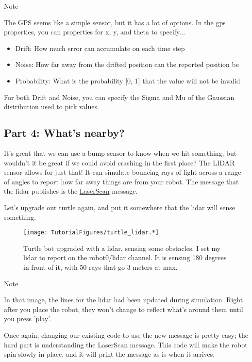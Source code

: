 Note

The GPS seems like a simple sensor, but it has a lot of options. In the
gps properties, you can properties for x, y, and theta to specify...

\begin{itemize}
\tightlist
\item
  Drift: How much error can accumulate on each time step
\item
  Noise: How far away from the drifted position can the reported
  position be
\item
  Probability: What is the probability {[}0, 1{]} that the value will
  not be invalid
\end{itemize}

For both Drift and Noise, you can specify the Sigma and Mu of the
Gaussian distribution used to pick values.

\hypertarget{part-4-whats-nearby}{%
\subsection{Part 4: What's nearby?}\label{part-4-whats-nearby}}

It's great that we can use a bump sensor to know when we hit something,
but wouldn't it be great if we could avoid crashing in the first place?
The LIDAR sensor allows for just that! It can simulate bouncing rays of
light across a range of angles to report how far away things are from
your robot. The message that the lidar publishes is the
\href{http://docs.ros.org/lunar/api/sensor_msgs/html/msg/LaserScan.html}{LaserScan}
message.

Let's upgrade our turtle again, and put it somewhere that the lidar will
sense something.

\begin{figure}
\centering
\texttt{[image: TutorialFigures/turtle\_lidar.*]}
\caption{Turtle bot upgraded with a lidar, sensing some obstacles. I set
my lidar to report on the robot0/lidar channel. It is sensing 180
degrees in front of it, with 50 rays that go 3 meters at max.}
\end{figure}

Note

In that image, the lines for the lidar had been updated during
simulation. Right after you place the robot, they won't change to
reflect what's around them until you press 'play'.

Once again, changing our existing code to use the new message is pretty
easy; the hard part is understanding the LaserScan message. This code
will make the robot spin slowly in place, and it will print the message
as-is when it arrives.


